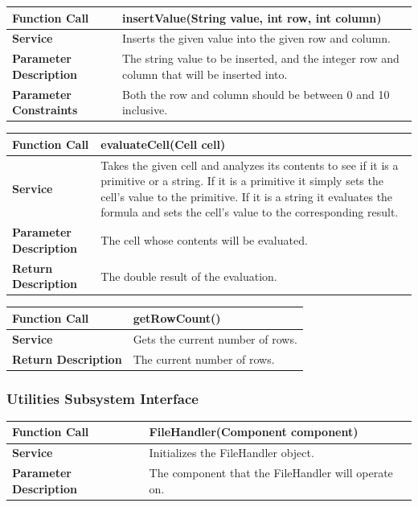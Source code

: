 \documentclass[12pt]{article}
\begin{document}
\begin{tabular}{|p{4.75cm}|p{11.25cm}|}
\hline
\textbf{Function Call} & insertValue(String value, int row, int column)
\\\hline
\textbf{Service} & Inserts the given value into the given row and column.
\\\hline
\textbf{Parameter Description} & The string value to be inserted, and the integer row and column that will be inserted into.
\\\hline
\textbf{Parameter Constraints} & Both the row and column should be between 0 and 10 inclusive.
\\\hline
\end{tabular}

\begin{tabular}{|p{4.75cm}|p{11.25cm}|}
\hline
\textbf{Function Call} & evaluateCell(Cell cell)
\\\hline
\textbf{Service} & Takes the given cell and analyzes its contents to see if it is a primitive or a string. If it is a primitive it simply sets the cell's value to the primitive. If it is a string it evaluates the formula and sets the cell's value to the corresponding result.
\\\hline
\textbf{Parameter Description} & The cell whose contents will be evaluated.
\\\hline
\textbf{Return Description} & The double result of the evaluation.
\\\hline
\end{tabular}

\begin{tabular}{|p{4.75cm}|p{11.25cm}|}
\hline
\textbf{Function Call} & getRowCount()
\\\hline
\textbf{Service} & Gets the current number of rows.
\\\hline
\textbf{Return Description} & The current number of rows.
\\\hline
\end{tabular}

\subsubsection{Utilities Subsystem Interface}

\begin{tabular}{|p{4.75cm}|p{11.25cm}|}
\hline
\textbf{Function Call} & FileHandler(Component component)
\\\hline
\textbf{Service} & Initializes the FileHandler object.
\\\hline
\textbf{Parameter Description} & The component that the FileHandler will operate on.
\\\hline
\end{tabular}
\end{document}
